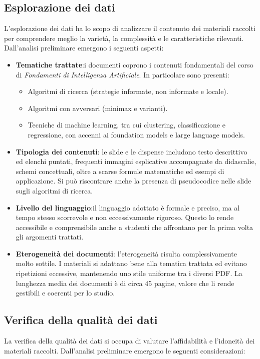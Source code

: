 \documentclass[a4paper,9pt]{article}
\begin{document}
\subsection{Esplorazione dei dati}
L’esplorazione dei dati ha lo scopo di analizzare il contenuto dei materiali raccolti per comprendere meglio la varietà, la complessità e le caratteristiche rilevanti.\\ 
Dall’analisi preliminare emergono i seguenti aspetti:
\begin{itemize}
	\item \textbf{Tematiche trattate}:i documenti coprono i contenuti fondamentali del corso di \textit{Fondamenti di Intelligenza Artificiale}. 
	In particolare sono presenti:
	\begin{itemize}
		\item Algoritmi di ricerca (strategie informate, non informate e locale). 
		\item Algoritmi con avversari (minimax e varianti).
		\item Tecniche di machine learning, tra cui clustering, classificazione e regressione, con accenni ai foundation models e large language models.
		
	\end{itemize}
	\item \textbf{Tipologia dei contenuti}: le slide e le dispense includono testo descrittivo ed elenchi puntati, frequenti immagini esplicative accompagnate da didascalie, schemi concettuali, oltre a scarse formule matematiche ed esempi di applicazione. Si può riscontrare anche la presenza di pseudocodice nelle slide sugli algoritmi di ricerca.
	\item \textbf{Livello del linguaggio}:il linguaggio adottato è formale e preciso, ma al tempo stesso scorrevole e non eccessivamente rigoroso. Questo lo rende accessibile e comprensibile anche a studenti che affrontano per la prima volta gli argomenti trattati.
	\item \textbf{Eterogeneità dei documenti}: l’eterogeneità risulta complessivamente molto sottile. I materiali si adattano bene alla tematica trattata ed evitano ripetizioni eccessive, mantenendo uno stile uniforme tra i diversi PDF. La lunghezza media dei documenti è di circa 45 pagine, valore che li rende gestibili e coerenti per lo studio.
\end{itemize}

\subsection{Verifica della qualità dei dati}
La verifica della qualità dei dati si occupa di valutare l’affidabilità e l’idoneità dei materiali raccolti.
Dall’analisi preliminare emergono le seguenti considerazioni:
\end{document}

